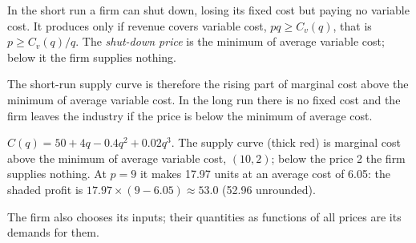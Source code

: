 \begin{definition}\label{def:b1:profit-maximisation:shut-down}
In the short run a firm can shut down, losing its fixed cost but paying no
variable cost. It produces only if revenue covers variable cost,
$pq \ge C_v(q)$, that is $p \ge C_v(q)/q$. The \emph{shut-down price} is the
minimum of average variable cost; below it the firm supplies nothing.
\end{definition}

The short-run supply curve is therefore the rising part of marginal cost
above the minimum of average variable cost. In the long run there is no
fixed cost and the firm leaves the industry if the price is below the
minimum of average cost.

\begin{omfigure}

{\small $C(q) = 50 + 4q - 0.4q^2 + 0.02q^3$. The supply curve (thick red) is marginal
cost above the minimum of average variable cost, $(10, 2)$; below the price 2
the firm supplies nothing. At $p = 9$ it makes 17.97 units at an average cost
of 6.05: the shaded profit is $17.97 \times (9 - 6.05) \approx 53.0$ (52.96 unrounded).}
\end{omfigure}

The firm also chooses its inputs; their quantities as functions of all
prices are its demands for them.

